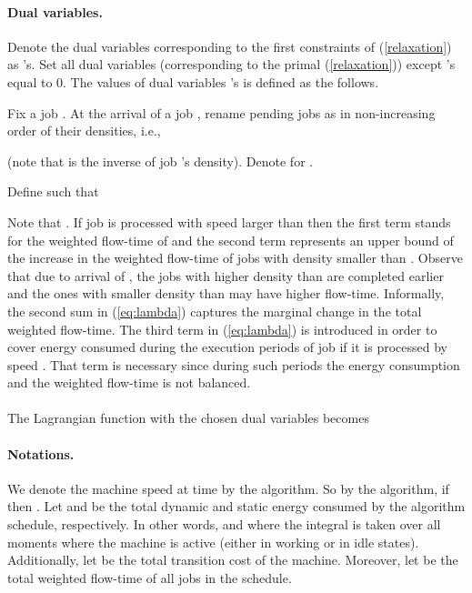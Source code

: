 \documentclass[11pt]{article}
\begin{document}
\paragraph{Dual variables.} 
Denote the dual variables corresponding to the first constraints of (\ref{relaxation}) 
as 's. Set all dual variables (corresponding to the primal (\ref{relaxation})) 
except 's equal to 0.
The values of dual variables 's is defined as the follows. 

Fix a job . At the arrival of a job , 
rename pending jobs as 
in non-increasing order of their  densities, i.e., 
 
(note that  is the inverse of job 's density).
Denote  for .

Define  such that 

Note that .
If job  is processed with speed larger than  then
the first term stands for the weighted flow-time of  and
the second term represents an upper bound of the increase 
in the weighted flow-time of jobs with density smaller than . 
Observe that due to arrival of , the jobs with higher density than 
are completed earlier and the ones with smaller density than 
may have higher flow-time. 
Informally, the second sum in (\ref{eq:lambda}) captures 
the marginal change in the total weighted flow-time. 
The third term in (\ref{eq:lambda}) is introduced in order to cover energy consumed during the 
execution periods of job  if it is processed by speed . That term is necessary 
since during such periods the 
energy consumption and the weighted flow-time is not balanced. 


\paragraph{}
The Lagrangian function  with the chosen dual variables becomes
 



\paragraph{Notations.}
We denote  the machine speed at time  by the algorithm. 
So by the algorithm, if  then .
Let  and  be the total dynamic and static 
energy consumed by the algorithm schedule, respectively. 
In other words, 
and  where the integral is taken over all moments 
 where the machine is active (either in working or in idle states).
Additionally, let  be the total transition cost of the machine.
Moreover, let  be the total weighted flow-time of all jobs 
in the schedule. 
\end{document}
